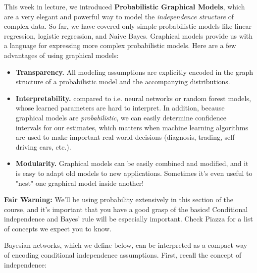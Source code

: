 \documentclass{discussion}
\begin{document}



This week in lecture, we introduced \textbf{Probabilistic Graphical Models}, which are a very elegant and powerful way to model the \textit{independence structure} of complex data.  So far, we have covered only simple probabilistic models like linear regression, logistic regression, and Naive Bayes.   Graphical models provide us with a language for expressing more complex probabilistic models.  Here are a few advantages of using graphical models:

\begin{itemize}
\item \textbf{Transparency.}  All modeling assumptions are explicitly encoded in the graph structure of a probabilistic model and the accompanying distributions. 
\item \textbf{Interpretability.} compared to i.e. neural networks or random forest models, whose learned parameters are hard to interpret.  In addition, because graphical models are \textit{probabilistic}, we can easily determine confidence intervals for our estimates, which matters when machine learning algorithms are used to make important real-world decisions (diagnosis, trading, self-driving cars, etc.).
\item \textbf{Modularity.}  Graphical models can be easily combined and modified, and it is easy to adapt old models to new applications.  Sometimes it's even useful to "nest" one graphical model inside another!
\end{itemize}

\begin{framed}
\textbf{Fair Warning:} We'll be using probability extensively in this section of the course, and it's important that you have a good grasp of the basics!  Conditional independence and Bayes' rule will be especially important.  Check Piazza for a list of concepts we expect you to know.
\end{framed}



Bayesian networks, which we define below, can be interpreted as a compact way of encoding conditional independence assumptions.  First, recall the concept of independence:
\end{document}
